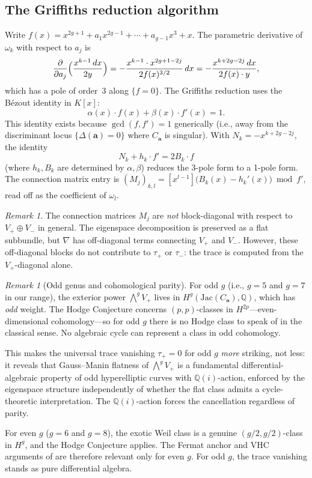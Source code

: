 \documentclass[11pt]{article}
\theoremstyle{plain}
\theoremstyle{definition}
\theoremstyle{remark}
\newtheorem{remark}[theorem]{Remark}
\newcommand{\QQ}{\mathbb{Q}}
\newcommand{\Jac}{\mathrm{Jac}}
\begin{document}
\subsection{The Griffiths reduction algorithm}
\label{sec:griffiths-algo}

Write $f(x) = x^{2g+1} + a_1 x^{2g-1} + \cdots + a_{g-1} x^3 + x$.
The parametric derivative of $\omega_k$ with respect to $a_j$ is
\[
  \frac{\partial}{\partial a_j}\Bigl(\frac{x^{k-1}\,dx}{2y}\Bigr)
  = -\frac{x^{k-1} \cdot x^{2g+1-2j}}{2f(x)^{3/2}}\,dx
  = -\frac{x^{k+2g-2j}\,dx}{2f(x) \cdot y},
\]
which has a pole of order~3 along $\{f = 0\}$.  The Griffiths reduction
uses the B\'ezout identity in $K[x]$:
\begin{equation}\label{eq:bezout}
  \alpha(x) \cdot f(x) + \beta(x) \cdot f'(x) = 1.
\end{equation}
This identity exists because $\gcd(f, f') = 1$ generically (i.e., away from
the discriminant locus $\{\Delta(\mathbf{a}) = 0\}$ where $C_{\mathbf{a}}$
is singular).  With $N_k = -x^{k+2g-2j}$, the identity
\[
  N_k + h_k \cdot f' = 2 B_k \cdot f
\]
(where $h_k, B_k$ are determined by $\alpha, \beta$) reduces the
3-pole form to a 1-pole form.  The connection matrix entry is
$(M_j)_{k,l} = [x^{l-1}]\bigl(B_k(x) - h_k'(x)\bigr) \bmod f'$,
read off as the coefficient of $\omega_l$.

\begin{remark}\label{rem:block}
The connection matrices $M_j$ are \emph{not} block-diagonal with respect to
$V_+ \oplus V_-$ in general.  The eigenspace decomposition is preserved as a
flat subbundle, but $\nabla$ has off-diagonal terms connecting $V_+$ and $V_-$.
However, these off-diagonal blocks do not contribute to $\tau_+$ or $\tau_-$:
the trace is computed from the $V_+$-diagonal alone.
\end{remark}

\begin{remark}[Odd genus and cohomological parity]\label{rem:parity}
For odd $g$ (i.e., $g = 5$ and $g = 7$ in our range), the exterior power
$\bigwedge^g V_+$ lives in $H^g(\Jac(C_{\mathbf{a}}), \QQ)$, which has
\emph{odd} weight.  The Hodge Conjecture concerns $(p,p)$-classes in
$H^{2p}$---even-dimensional cohomology---so for odd $g$ there is no
Hodge class to speak of in the classical sense.  No algebraic cycle can
represent a class in odd cohomology.

This makes the universal trace vanishing $\tau_+ = 0$ for odd $g$
\emph{more} striking, not less: it reveals that Gauss--Manin flatness of
$\bigwedge^g V_+$ is a fundamental differential-algebraic property of odd
hyperelliptic curves with $\QQ(i)$-action, enforced by the eigenspace
structure independently of whether the flat class admits a cycle-theoretic
interpretation.  The $\QQ(i)$-action forces the cancellation regardless of
parity.

For even $g$ ($g = 6$ and $g = 8$), the exotic Weil class is a genuine
$(g/2, g/2)$-class in $H^g$, and the Hodge Conjecture applies.
The Fermat anchor and VHC arguments of  are therefore
relevant only for even $g$.  For odd $g$, the trace vanishing stands as
pure differential algebra.
\end{remark}
\end{document}
